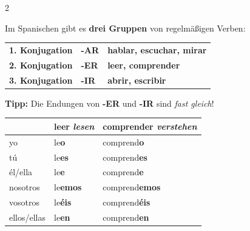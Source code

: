 \documentclass[10pt, a4paper]{article}
\newcommand{\es}[1]{\textbf{#1}}
\newcommand{\de}[1]{{\small\textit{\textcolor{mittelgrau}{#1}}}}
\newcommand{\ender}[1]{\textcolor{endungER}{\textbf{#1}}}
\newcommand{\endir}[1]{\textcolor{endungIR}{\textbf{#1}}}
\newcommand{\endar}[1]{\textcolor{endungAR}{\textbf{#1}}}
\begin{document}
\begin{multicols}{2}


\begin{grammatikbox}

\vspace{2pt}

Im Spanischen gibt es \textbf{drei Gruppen} von regelmäßigen Verben:

\vspace{4pt}

{\small
\renewcommand{\arraystretch}{1.3}
\begin{tabular}{@{}lll@{}}
\textbf{1. Konjugation} & \endar{-AR} & \es{hablar, escuchar, mirar} \\
\textbf{2. Konjugation} & \ender{-ER} & \es{leer, comprender} \\
\textbf{3. Konjugation} & \endir{-IR} & \es{abrir, escribir} \\
\end{tabular}}

\vspace{6pt}

{\footnotesize\textbf{Tipp:} Die Endungen von \ender{-ER} und \endir{-IR} sind \textit{fast gleich}!}

\end{grammatikbox}

\vspace{4pt}


\begin{merkbox}

\vspace{2pt}

{\small
\renewcommand{\arraystretch}{1.4}
\begin{tabular}{@{}l|l|l@{}}
& \textbf{leer} \de{lesen} & \textbf{comprender} \de{verstehen} \\
\hline
yo & le\ender{o} & comprend\ender{o} \\
tú & le\ender{es} & comprend\ender{es} \\
él/ella & le\ender{e} & comprend\ender{e} \\
nosotros & le\ender{emos} & comprend\ender{emos} \\
vosotros & le\ender{éis} & comprend\ender{éis} \\
ellos/ellas & le\ender{en} & comprend\ender{en} \\
\end{tabular}}


\end{merkbox}
\end{multicols}
\end{document}
